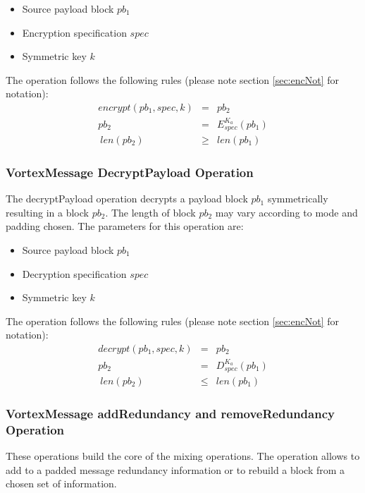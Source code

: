 \begin{itemize}
	\item Source payload block $pb_1$
	\item Encryption specification $spec$
	\item Symmetric key $k$
\end{itemize}

The operation follows the following rules (please note section \ref{sec:encNot} for notation):
\begin{eqnarray}
encrypt(pb_1, spec, k) & = & pb_2 \\
pb_2 & = & E_{spec}^{K_a}\left( pb_1 \right)\\\
len(pb_2) & \geq & len(pb_1)
\end{eqnarray}


\subsubsection{VortexMessage DecryptPayload Operation}
The decryptPayload operation decrypts a payload block $pb_1$ symmetrically resulting in a block $pb_2$. The length of block $pb_2$ may vary according to mode and padding chosen. The parameters for this operation are:

\begin{itemize}
	\item Source payload block $pb_1$
	\item Decryption specification $spec$
	\item Symmetric key $k$
\end{itemize}

The operation follows the following rules (please note section \ref{sec:encNot} for notation):
\begin{eqnarray}
decrypt(pb_1, spec, k) & = & pb_2 \\
pb_2 & = & D_{spec}^{K_a}\left( pb_1 \right)\\\
len(pb_2) & \leq & len(pb_1)
\end{eqnarray}

\subsubsection{VortexMessage addRedundancy and removeRedundancy Operation}
These operations build the core of the mixing operations. The operation allows to add to a padded message redundancy information or to rebuild a block from a chosen set of information. 


